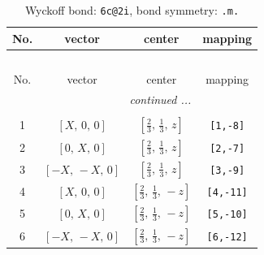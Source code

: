 \documentclass[fleqn,8pt]{jsarticle}
\begin{document}
\renewcommand{\arraystretch}{1.2}
\begin{longtable}{cccc}
\caption{Wyckoff bond: {\tt 6c@2i}, bond symmetry: {\tt .m.}}
 \\
 \hline \hline
No. & vector & center & mapping \\ \hline \endfirsthead

\multicolumn{3}{l}{\tablename\ \thetable{}} \\
 \hline \hline
No. & vector & center & mapping \\ \hline \endhead

 \hline \hline
\multicolumn{3}{r}{\footnotesize\it continued ...} \\ \endfoot

 \hline \hline
\multicolumn{3}{r}{} \\ \endlastfoot

1 & $\left[ X,\, 0,\, 0 \right]$ & $\left[ \frac{2}{3},\, \frac{1}{3},\, z \right]$ & {\tt [1,-8]} \\ \hline
2 & $\left[ 0,\, X,\, 0 \right]$ & $\left[ \frac{2}{3},\, \frac{1}{3},\, z \right]$ & {\tt [2,-7]} \\ \hline
3 & $\left[ - X,\, - X,\, 0 \right]$ & $\left[ \frac{2}{3},\, \frac{1}{3},\, z \right]$ & {\tt [3,-9]} \\ \hline
4 & $\left[ X,\, 0,\, 0 \right]$ & $\left[ \frac{2}{3},\, \frac{1}{3},\, - z \right]$ & {\tt [4,-11]} \\ \hline
5 & $\left[ 0,\, X,\, 0 \right]$ & $\left[ \frac{2}{3},\, \frac{1}{3},\, - z \right]$ & {\tt [5,-10]} \\ \hline
6 & $\left[ - X,\, - X,\, 0 \right]$ & $\left[ \frac{2}{3},\, \frac{1}{3},\, - z \right]$ & {\tt [6,-12]} \\
\end{longtable}
\renewcommand{\arraystretch}{1.2}
\end{document}
